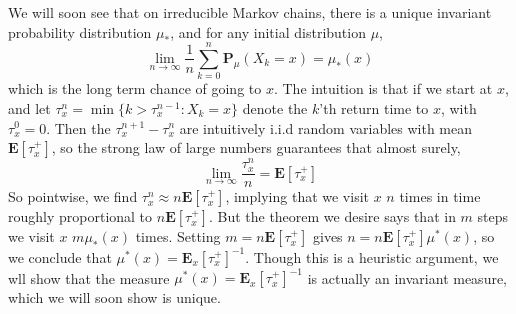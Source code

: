 We will soon see that on irreducible Markov chains, there is a unique invariant probability distribution $\mu_*$, and for any initial distribution $\mu$,
%
\[ \lim_{n \to \infty} \frac{1}{n} \sum_{k = 0}^n \mathbf{P}_\mu(X_k = x) = \mu_*(x) \]
%
which is the long term chance of going to $x$. The intuition is that if we start at $x$, and let $\tau_x^n = \min \{ k > \tau_x^{n-1} : X_k = x \}$ denote the $k$'th return time to $x$, with $\tau_x^0 = 0$. Then the $\tau_x^{n+1} - \tau_x^n$ are intuitively i.i.d random variables with mean $\mathbf{E}[\tau_x^+]$, so the strong law of large numbers guarantees that almost surely,
%
\[ \lim_{n \to \infty} \frac{\tau_x^n}{n} = \mathbf{E}[\tau_x^+] \]
%
So pointwise, we find $\tau_x^n \approx n \mathbf{E}[\tau_x^+]$, implying that we visit $x$ $n$ times in time roughly proportional to $n \mathbf{E}[\tau_x^+]$. But the theorem we desire says that in $m$ steps we visit $x$ $m \mu_*(x)$ times. Setting $m = n \mathbf{E}[\tau_x^+]$ gives $n = n\mathbf{E}[\tau_x^+]\mu^*(x)$, so we conclude that $\mu^*(x) = \mathbf{E}_x[\tau_x^+]^{-1}$. Though this is a heuristic argument, we wll show that the measure $\mu^*(x) = \mathbf{E}_x[\tau_x^+]^{-1}$ is actually an invariant measure, which we will soon show is unique.

